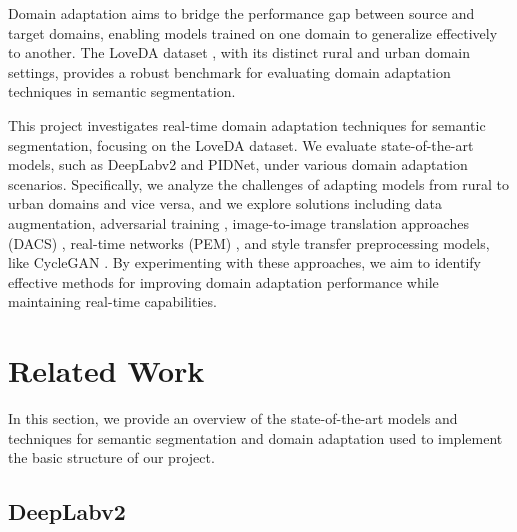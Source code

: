 \documentclass[10pt,twocolumn,letterpaper]{article}
\begin{document}
Domain adaptation aims to bridge the performance gap between source and target domains, enabling models trained on one domain to generalize effectively to another. The LoveDA dataset \cite{wang2021loveda}, with its distinct rural and urban domain settings, provides a robust benchmark for evaluating domain adaptation techniques in semantic segmentation. 

This project investigates real-time domain adaptation techniques for semantic segmentation, focusing on the LoveDA dataset. We evaluate state-of-the-art models, such as DeepLabv2 and PIDNet, under various domain adaptation scenarios. Specifically, we analyze the challenges of adapting models from rural to urban domains and vice versa, and we explore solutions including data augmentation, adversarial training \cite{tsai2018advlearning}, image-to-image translation approaches (DACS) \cite{tranheden2021dacs}, real-time networks (PEM) \cite{cavagnero2024pem}, and style transfer preprocessing models, like CycleGAN \cite{zhu2020cyclegan}. By experimenting with these approaches, we aim to identify effective methods for improving domain adaptation performance while maintaining real-time capabilities.

\section{Related Work}
\label{sec:related}

In this section, we provide an overview of the state-of-the-art models and techniques for semantic segmentation and domain adaptation used to implement the basic structure of our project.

\subsection{DeepLabv2}
\end{document}
